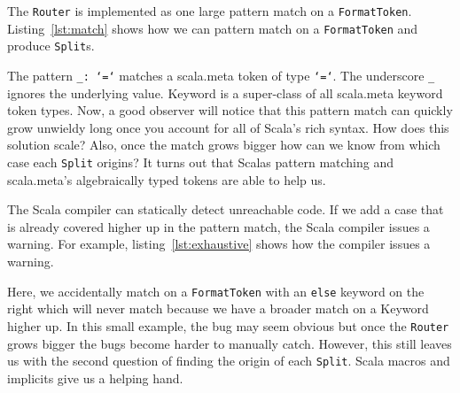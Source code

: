 The \texttt{Router} is implemented as one large pattern match on a \texttt{FormatToken}.
Listing~\ref{lst:match} shows how we can pattern match on a \texttt{FormatToken} and produce \texttt{Split}s.
\begin{minipage}{\linewidth}
  
\end{minipage}
The pattern \texttt{\_: `=`} matches a scala.meta token of type \texttt{`=`}.
The underscore \texttt{\_} ignores the underlying value.
Keyword is a super-class of all scala.meta keyword token types.
Now, a good observer will notice that this pattern match can quickly grow unwieldy long once you account for all of Scala's rich syntax.
How does this solution scale?
Also, once the match grows bigger how can we know from which case each \texttt{Split} origins?
It turns out that Scalas pattern matching and scala.meta's algebraically typed tokens are able to help us.

The Scala compiler can statically detect unreachable code.
If we add a case that is already covered higher up in the pattern match, the Scala compiler issues a warning.
For example, listing~\ref{lst:exhaustive} shows how the compiler issues a warning.
\begin{minipage}{\linewidth}
  
\end{minipage}
Here, we accidentally match on a \texttt{FormatToken} with an \texttt{else} keyword on the right which will never match because we have a broader match on a Keyword higher up.
In this small example, the bug may seem obvious but once the \texttt{Router} grows bigger the bugs become harder to manually catch.
However, this still leaves us with the second question of finding the origin of each \texttt{Split}.
Scala macros\autocite{burmako2013scala} and implicits\autocite{oliveira2010type} give us a helping hand.

